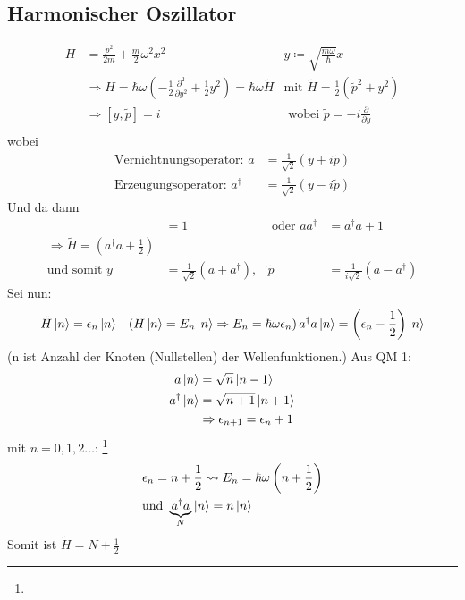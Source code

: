 \subsection{Harmonischer Oszillator}
	\begin{align*}
		H &= \frac{p^2}{2m} + \frac{m}{2} \omega^2 x^2 
		&y\coloneqq \sqrt{\frac{m \omega}{\hbar}} x \\
		&\Rightarrow H 
		= \hbar \omega \left(- \frac{1}{2} \frac{\partial^2}{\partial y^2} 
		+ \frac{1}{2} y^2\right)
		= \hbar \omega \tilde{H} 
		&\text{mit~} \tilde{H} = \frac{1}{2} \left(\tilde{p}^2 + y^2\right)\\
		&\Rightarrow \left[ y, \tilde{p}\right] = i 
		&\text{~wobei~} \tilde{p} =-i \frac{\partial}{\partial y} \\
	\end{align*} %
wobei 
	\begin{align*}
		\text{Vernichtnungsoperator:~} a &= \frac{1}{\sqrt{2}} 
		\left( y + i \tilde{p} \right) \\
		\text{Erzeugungsoperator:~} a^\dagger &= \frac{1}{\sqrt{2}} 
		\left( y - i \tilde{p} \right)
	\end{align*}
Und da dann
	\begin{align*}
		[a , a^\dagger] &= 1 &\text{~oder~} a a^\dagger &= a^\dagger a + 1 \\
		\Rightarrow \tilde{H} = \left( a^\dagger a + \frac{1}{2} \right)& \\
		\text{und somit~} 
		y &= \frac{1}{\sqrt{2}} \left( a + a^\dagger \right),& 
		\tilde{p} &= \frac{1}{i\sqrt{2}} \left( a - a^\dagger \right)
	\end{align*}
Sei nun:
	\begin{align*}
		\tilde{H} \ket{n} &= \epsilon_n \ket{n} &\left( H \ket{n} = E_n \ket{n} 
		\Rightarrow E_n = \hbar \omega \epsilon_n \right)
		a^\dagger a \ket{n} = \left( \epsilon_n - \frac{1}{2} \right) \ket{n}
	\end{align*}
(n ist Anzahl der Knoten (Nullstellen) der Wellenfunktionen.)
Aus QM 1:
	\begin{align*}
		a \ket{n} &= \sqrt{n} \ket{n-1} \\
		a^\dagger \ket {n} &= \sqrt{n+1} \ket{n+1} \\
		&\Rightarrow \epsilon_{n+1} = \epsilon_n + 1
	\end{align*}
mit $n = 0, 1, 2 \ldots$: \footnote{}
	\begin{align*}
		&\epsilon_n = n + \frac{1}{2} \leadsto E_n = \hbar \omega \left(n + \frac{1}{2} \right) \\
		&\text{und~} \underbrace{a^\dagger a}_{\substack{N}}
		\ket{n} = n \ket{n}
	\end{align*} 
Somit ist $\tilde{H} = N + \frac{1}{2}$